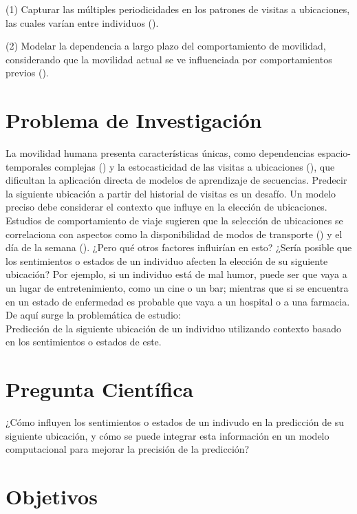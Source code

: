 (1) Capturar las múltiples periodicidades en los 
patrones de visitas a ubicaciones, las cuales varían entre 
individuos (\cite{feng2018deepmove}). 

(2) Modelar la dependencia a largo plazo del 
comportamiento de movilidad, considerando que la movilidad actual 
se ve influenciada por comportamientos previos (\cite{Cherchi2017,Sun2013}).

\section{Problema de Investigación}

La movilidad humana presenta características únicas, como 
dependencias espacio-temporales complejas (\cite{feng2018deepmove,li2020hierarchical}) y la 
estocasticidad de las visitas a ubicaciones (\cite{Song2010}), que 
dificultan la aplicación directa de modelos de aprendizaje de 
secuencias. Predecir la siguiente ubicación a partir del 
historial de visitas es un desafío. Un modelo preciso debe 
considerar el contexto que influye en la elección de ubicaciones.  
Estudios de comportamiento de viaje sugieren que la selección de 
ubicaciones se correlaciona con aspectos como la disponibilidad 
de modos de transporte (\cite{Hong_2022}) y el día de la semana (\cite{Dharmowijoyo2016}). 
¿Pero qu\'e otros factores influir\'ian en esto? ¿Ser\'ia posible
que los sentimientos o estados de un individuo afecten la elección
de su siguiente ubicación? Por ejemplo, si un individuo
está de mal humor, puede ser que vaya a un lugar
de entretenimiento, como un cine o un bar; mientras que si
se encuentra en un estado de enfermedad es probable que
vaya a un hospital o a una farmacia. De aqu\'i surge la
problem\'atica de estudio:\\

Predicci\'on de la siguiente ubicación de un individuo utilizando contexto
basado en los sentimientos o estados de este.

\section{Pregunta Científica}

¿Cómo influyen los sentimientos o estados de un indivudo en 
la predicción de su siguiente 
ubicación, y cómo se puede integrar esta 
información en un modelo computacional para mejorar la 
precisión de la predicción?

\section{Objetivos}
